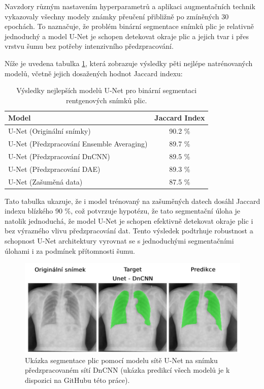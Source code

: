 \documentclass[male,czech,api_ing]{thesis}
\begin{document}
Navzdory různým nastavením hyperparametrů a aplikaci augmentačních technik vykazovaly všechny modely známky přeučení přibližně po zmíněných 30 epochách. To naznačuje, že problém binární segmentace snímků plic je relativně jednoduchý a model U-Net je schopen detekovat okraje plic a jejich tvar i přes vrstvu šumu bez potřeby intenzivního předzpracování.

Níže je uvedena tabulka \ref{tab:BinaryUnetResults}, která zobrazuje výsledky pěti nejlépe natrénovaných modelů, včetně jejich dosažených hodnot Jaccard indexu:

\begin{table}[h]
    \centering
    \begin{tabular}{|l|c|}
        \hline
        \textbf{Model}                            & \textbf{Jaccard Index} \\ \hline
        U-Net (Originální snímky)                 & 90.2 \%                 \\ \hline
        U-Net (Předzpracování Ensemble Averaging) & 89.7 \%                 \\ \hline
        U-Net (Předzpracování DnCNN)              & 89.5 \%                 \\ \hline
        U-Net (Předzpracování DAE)                & 89.3 \%                 \\ \hline
        U-Net (Zašuměná data)                     & 87.5 \%                 \\ \hline
    \end{tabular}
    \caption{Výsledky nejlepších modelů U-Net pro binární segmentaci rentgenových snímků plic.}
    \label{tab:BinaryUnetResults}
\end{table}

Tato tabulka ukazuje, že i model trénovaný na zašuměných datech dosáhl Jaccard indexu blízkého 90 \%, což potvrzuje hypotézu, že tato segmentační úloha je natolik jednoduchá, že model U-Net je schopen efektivně detekovat okraje plic i bez výrazného vlivu předzpracování dat. Tento výsledek podtrhuje robustnost a schopnost U-Net architektury vyrovnat se s jednoduchými segmentačními úlohami i za podmínek přítomnosti šumu.

\begin{figure}[h]
    \centering
    \includegraphics[width=\linewidth]{Prilohy/Obrazky/BinaryUnetDnCNN.png}
    \caption{Ukázka segmentace plic pomocí modelu sítě U-Net na snímku předzpracovaném sítí DnCNN (ukázka predikcí všech modelů je k dispozici na GitHubu této práce).}
    \label{fig:BinaryUnet}
\end{figure}
\end{document}
